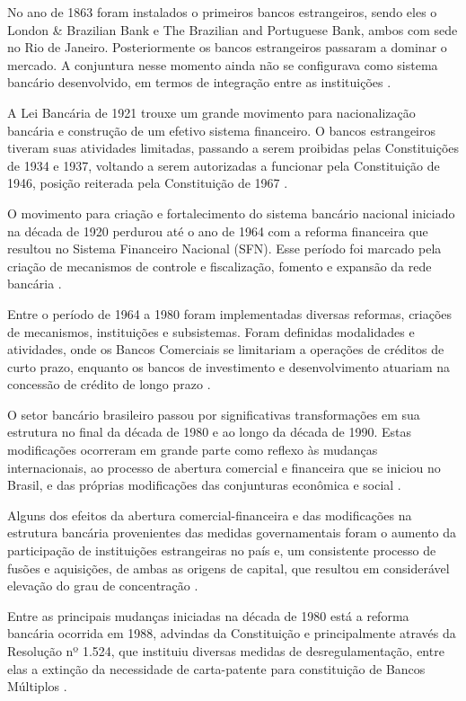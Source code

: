 \documentclass[
  12pt,
  12pt,
  openright,
  oneside,
  a4paper,
  chapter=TITLE,
  section=TITLE,
  subsection=TITLE,
  subsubsection=TITLE,
  english,
  portugues,
  sumario=tradicional]{abntex2}
\begin{document}
No ano de 1863 foram instalados o primeiros bancos estrangeiros, sendo eles o London \& Brazilian Bank e The Brazilian and Portuguese Bank, ambos com sede no Rio de Janeiro. Posteriormente os bancos estrangeiros passaram a dominar o mercado. A conjuntura nesse momento ainda não se configurava como sistema bancário desenvolvido, em termos de integração entre as instituições \cite{camargo:2009, guimaraes:2011, mendes:2014}.

A Lei Bancária de 1921 trouxe um grande movimento para nacionalização bancária e construção de um efetivo sistema financeiro. O bancos estrangeiros tiveram suas atividades limitadas, passando a serem proibidas pelas Constituições de 1934 e 1937, voltando a serem autorizadas a funcionar pela Constituição de 1946, posição reiterada pela Constituição de 1967 \cite{camargo:2009, decreto:1921, guimaraes:2011}.

O movimento para criação e fortalecimento do sistema bancário nacional iniciado na década de 1920 perdurou até o ano de 1964 com a reforma financeira que resultou no Sistema Financeiro Nacional (SFN). Esse período foi marcado pela criação de mecanismos de controle e fiscalização, fomento e expansão da rede bancária \cite{camargo:2009, guimaraes:2011}.

Entre o período de 1964 a 1980 foram implementadas diversas reformas, criações de mecanismos, instituições e subsistemas. Foram definidas modalidades e atividades, onde os Bancos Comerciais se limitariam a operações de créditos de curto prazo, enquanto os bancos de investimento e desenvolvimento atuariam na concessão de crédito de longo prazo \cite{camargo:2009}.

O setor bancário brasileiro passou por significativas transformações em sua estrutura no final da década de 1980 e ao longo da década de 1990. Estas modificações ocorreram em grande parte como reflexo às mudanças internacionais, ao processo de abertura comercial e financeira que se iniciou no Brasil, e das próprias modificações das conjunturas econômica e social \cite{camargo:2009}.

Alguns dos efeitos da abertura comercial-financeira e das modificações na estrutura bancária provenientes das medidas governamentais foram o aumento da participação de instituições estrangeiras no país e, um consistente processo de fusões e aquisições, de ambas as origens de capital, que resultou em considerável elevação do grau de concentração \cite{camargo:2009}.

Entre as principais mudanças iniciadas na década de 1980 está a reforma bancária ocorrida em 1988, advindas da Constituição e principalmente através da Resolução nº 1.524, que instituiu diversas medidas de desregulamentação, entre elas a extinção da necessidade de carta-patente para constituição de Bancos Múltiplos \cite{Res:1524:1988}.
\end{document}
